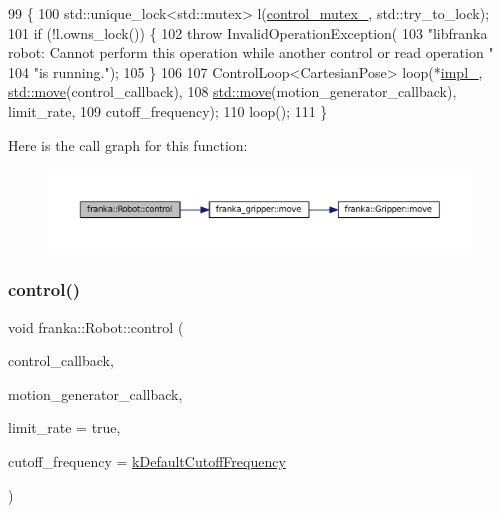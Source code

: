 \begin{DoxyCode}
99                              \{
100   std::unique\_lock<std::mutex> l(\hyperlink{classfranka_1_1Robot_a719ad1fab76f8edfc9f6f761671c1375}{control\_mutex\_}, std::try\_to\_lock);
101   \textcolor{keywordflow}{if} (!l.owns\_lock()) \{
102     \textcolor{keywordflow}{throw} InvalidOperationException(
103         \textcolor{stringliteral}{"libfranka robot: Cannot perform this operation while another control or read operation "}
104         \textcolor{stringliteral}{"is running."});
105   \}
106 
107   ControlLoop<CartesianPose> loop(*\hyperlink{classfranka_1_1Robot_aca155054184e5b6478942fd6a1b82ba4}{impl\_}, \hyperlink{namespacefranka__gripper_a1356a87108d2229401d3755bd3e53bdf}{std::move}(control\_callback),
108                                   \hyperlink{namespacefranka__gripper_a1356a87108d2229401d3755bd3e53bdf}{std::move}(motion\_generator\_callback), limit\_rate,
109                                   cutoff\_frequency);
110   loop();
111 \}
\end{DoxyCode}
Here is the call graph for this function\+:
\nopagebreak
\begin{figure}[H]
\begin{center}
\leavevmode
\includegraphics[width=350pt]{classfranka_1_1Robot_a368c282fca42f4214864d0d39893fc6e_cgraph}
\end{center}
\end{figure}
\mbox{\label{classfranka_1_1Robot_a3cc02de96810eebc74f499f5821f2ac9}} 
\subsubsection{\texorpdfstring{control()}{control()}\hspace{0.1cm}{\footnotesize\ttfamily [5/9]}}
{\footnotesize\ttfamily void franka\+::\+Robot\+::control (\begin{DoxyParamCaption}\item[{std\+::function$<$ \hyperlink{classfranka_1_1Torques}{Torques}(const \hyperlink{structfranka_1_1RobotState}{Robot\+State} \&, \hyperlink{classfranka_1_1Duration}{franka\+::\+Duration})$>$}]{control\+\_\+callback,  }\item[{std\+::function$<$ \hyperlink{classfranka_1_1CartesianVelocities}{Cartesian\+Velocities}(const \hyperlink{structfranka_1_1RobotState}{Robot\+State} \&, \hyperlink{classfranka_1_1Duration}{franka\+::\+Duration})$>$}]{motion\+\_\+generator\+\_\+callback,  }\item[{\hyperlink{classbool}{bool}}]{limit\+\_\+rate = {\ttfamily true},  }\item[{double}]{cutoff\+\_\+frequency = {\ttfamily \hyperlink{namespacefranka_ad8e3b7da346e03181ab5ac138a4171d4}{k\+Default\+Cutoff\+Frequency}} }\end{DoxyParamCaption})}

